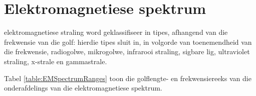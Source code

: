 \section{Elektromagnetiese spektrum}
            \nopagebreak
e\-lek\-tro\-mag\-ne\-tie\-se straling word geklassifiseer in tipes, afhangend van die frekwensie van die golf: hierdie tipes sluit in, in volgorde van toenemendheid van die frekwensie, radiogolwe, mikrogolwe, infrarooi straling, sigbare lig, ultraviolet straling, x-strale en gammastrale. \par 
            \nopagebreak
      


Tabel \ref{table:EMSpectrumRanges} toon die golflengte- en frekwensiereeks van die onderafdelings van die elektromagnetiese spektrum.\par 

